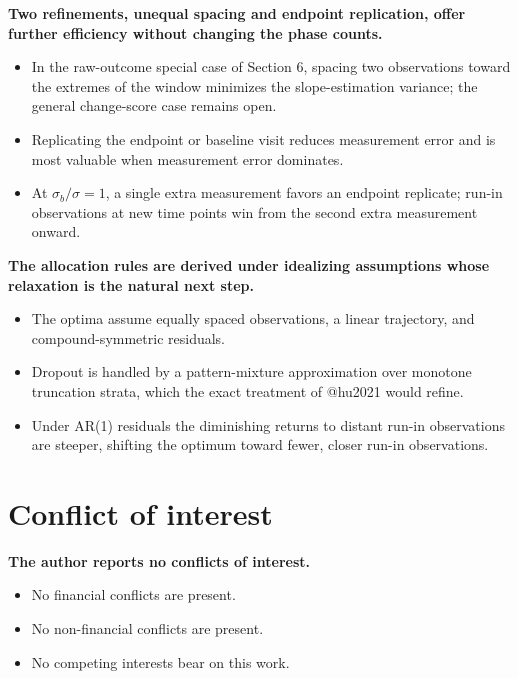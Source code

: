 \documentclass[
  11pt,
]{article}
\begin{document}
\textbf{Two refinements, unequal spacing and endpoint replication, offer further efficiency without changing the phase counts.}

\begin{itemize}\setlength{\itemsep}{2pt}\setlength{\parskip}{0pt}
\item In the raw-outcome special case of Section 6, spacing two observations toward the extremes of the window minimizes the slope-estimation variance; the general change-score case remains open.
\item Replicating the endpoint or baseline visit reduces measurement error and is most valuable when measurement error dominates.
\item At $\sigma_b/\sigma = 1$, a single extra measurement favors an endpoint replicate; run-in observations at new time points win from the second extra measurement onward.
\end{itemize}

\textbf{The allocation rules are derived under idealizing assumptions whose relaxation is the natural next step.}

\begin{itemize}\setlength{\itemsep}{2pt}\setlength{\parskip}{0pt}
\item The optima assume equally spaced observations, a linear trajectory, and compound-symmetric residuals.
\item Dropout is handled by a pattern-mixture approximation over monotone truncation strata, which the exact treatment of @hu2021 would refine.
\item Under AR(1) residuals the diminishing returns to distant run-in observations are steeper, shifting the optimum toward fewer, closer run-in observations.
\end{itemize}

\section{Conflict of interest}\label{conflict-of-interest}

\textbf{The author reports no conflicts of interest.}

\begin{itemize}\setlength{\itemsep}{2pt}\setlength{\parskip}{0pt}
\item No financial conflicts are present.
\item No non-financial conflicts are present.
\item No competing interests bear on this work.
\end{itemize}
\end{document}
